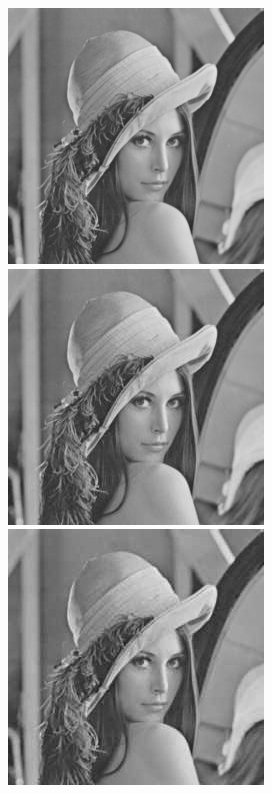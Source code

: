 \begin{figure}[ht]
	\centering
	\begin{minipage}[c]{0.19\linewidth}
		\centering
	 	\includegraphics[trim = 20mm 30mm 40mm 30mm, clip]{lena256x256_100.jpg}
	\end{minipage}
	\begin{minipage}[c]{0.19\linewidth}
		\centering
	 	\includegraphics[trim = 20mm 30mm 40mm 30mm, clip]{lena256x256_70.jpg}
	\end{minipage}
	\begin{minipage}[c]{0.19\linewidth}
		\centering
	 	\includegraphics[trim = 20mm 30mm 40mm 30mm, clip]{lena256x256_40.jpg}

\end{minipage}
\end{figure}
